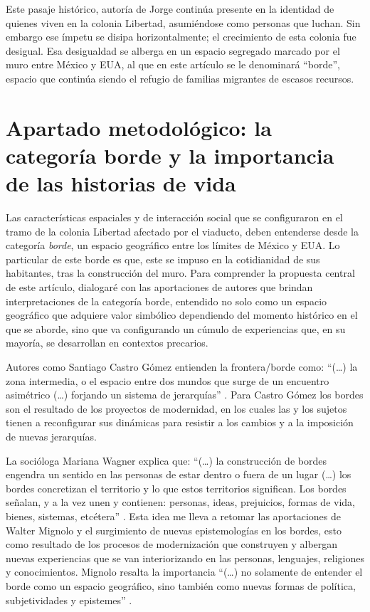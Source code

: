\documentclass[
  spanish,
  11pt,
  a4paper,
]{scrbook}
\begin{document}
Este pasaje histórico, autoría de Jorge \textcite{Bustamante1990}
continúa presente en la identidad de quienes viven en la colonia
Libertad, asumiéndose como personas que luchan. Sin embargo ese ímpetu
se disipa horizontalmente; el crecimiento de esta colonia fue desigual.
Esa desigualdad se alberga en un espacio segregado marcado por el muro
entre México y EUA, al que en este artículo se le denominará ``borde'',
espacio que continúa siendo el refugio de familias migrantes de escasos
recursos.

\section*{Apartado metodológico: la categoría borde y la importancia de
las historias de
vida}\label{apartado-metodoluxf3gico-la-categoruxeda-borde-y-la-importancia-de-las-historias-de-vida}


Las características espaciales y de interacción social que se
configuraron en el tramo de la colonia Libertad afectado por el
viaducto, deben entenderse desde la categoría \emph{borde}, un espacio
geográfico entre los límites de México y EUA. Lo particular de este
borde es que, este se impuso en la cotidianidad de sus habitantes, tras
la construcción del muro. Para comprender la propuesta central de este
artículo, dialogaré con las aportaciones de autores que brindan
interpretaciones de la categoría borde, entendido no solo como un
espacio geográfico que adquiere valor simbólico dependiendo del momento
histórico en el que se aborde, sino que va configurando un cúmulo de
experiencias que, en su mayoría, se desarrollan en contextos precarios.

Autores como Santiago Castro Gómez entienden la frontera/borde como:
``(\ldots) la zona intermedia, o el espacio entre dos mundos que surge
de un encuentro asimétrico (\ldots) forjando un sistema de jerarquías''
\autocite[12]{Castro2007}. Para Castro Gómez los bordes son el resultado
de los proyectos de modernidad, en los cuales las y los sujetos tienen a
reconfigurar sus dinámicas para resistir a los cambios y a la imposición
de nuevas jerarquías.

La socióloga Mariana Wagner explica que: ``(\ldots) la construcción de
bordes engendra un sentido en las personas de estar dentro o fuera de un
lugar (\ldots) los bordes concretizan el territorio y lo que estos
territorios significan. Los bordes señalan, y a la vez unen y contienen:
personas, ideas, prejuicios, formas de vida, bienes, sistemas,
etcétera'' \autocite[180]{Wagner2016}. Esta idea me lleva a retomar las
aportaciones de Walter Mignolo y el surgimiento de nuevas epistemologías
en los bordes, esto como resultado de los procesos de modernización que
construyen y albergan nuevas experiencias que se van interiorizando en
las personas, lenguajes, religiones y conocimientos. Mignolo resalta la
importancia ``(\ldots) no solamente de entender el borde como un espacio
geográfico, sino también como nuevas formas de política, subjetividades
y epistemes'' \autocite[315]{Mignolo2015}.
\end{document}
